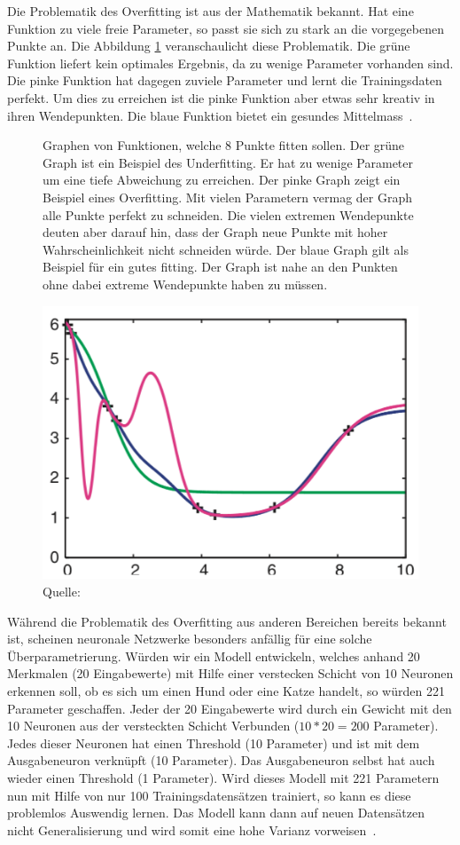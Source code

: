 Die Problematik des Overfitting ist aus der Mathematik bekannt. Hat eine Funktion zu viele freie Parameter, so passt sie sich zu stark an die vorgegebenen Punkte an. Die Abbildung \ref{krogh:d} veranschaulicht diese Problematik. Die grüne Funktion liefert kein optimales Ergebnis, da zu wenige Parameter vorhanden sind. Die pinke Funktion hat dagegen zuviele Parameter und lernt die Trainingsdaten perfekt. Um dies zu erreichen ist die pinke Funktion aber etwas sehr kreativ in ihren Wendepunkten. Die blaue Funktion bietet ein gesundes Mittelmass~\autocite{Krogh2008}.

\begin{figure}[h]
    \captionsetup{width=.9\linewidth}
    \caption[Graphen von Funktionen, welche 8 Punkte fitten sollen]{Graphen von Funktionen, welche 8 Punkte fitten sollen. Der grüne Graph ist ein Beispiel des Underfitting. Er hat zu wenige Parameter um eine tiefe Abweichung zu erreichen. Der pinke Graph zeigt ein Beispiel eines Overfitting. Mit vielen Parametern vermag der Graph alle Punkte perfekt zu schneiden. Die vielen extremen Wendepunkte deuten aber darauf hin, dass der Graph neue Punkte mit hoher Wahrscheinlichkeit nicht schneiden würde. Der blaue Graph gilt als Beispiel für ein gutes fitting. Der Graph ist nahe an den Punkten ohne dabei extreme Wendepunkte haben zu müssen.}
    \label{krogh:d}
    \centering
    \includegraphics[width=0.6\linewidth]{graphics/krogh/krogh_overfitting.png}
    \caption*{Quelle: \textcite{Krogh2008}}
\end{figure}

Während die Problematik des Overfitting aus anderen Bereichen bereits bekannt ist, scheinen neuronale Netzwerke besonders anfällig für eine solche Überparametrierung. Würden wir ein Modell entwickeln, welches anhand 20 Merkmalen (20 Eingabewerte) mit Hilfe einer verstecken Schicht von 10 Neuronen erkennen soll, ob es sich um einen Hund oder eine Katze handelt, so würden 221 Parameter geschaffen. Jeder der 20 Eingabewerte wird durch ein Gewicht mit den 10 Neuronen aus der versteckten Schicht Verbunden ($10 * 20 = 200$ Parameter). Jedes dieser Neuronen hat einen Threshold (10 Parameter) und ist mit dem Ausgabeneuron verknüpft (10 Parameter). Das Ausgabeneuron selbst hat auch wieder einen Threshold (1 Parameter). Wird dieses Modell mit 221 Parametern nun mit Hilfe von nur 100 Trainingsdatensätzen trainiert, so kann es diese problemlos Auswendig lernen. Das Modell kann dann auf neuen Datensätzen nicht Generalisierung und wird somit eine hohe Varianz vorweisen~\autocite{Krogh2008}.

